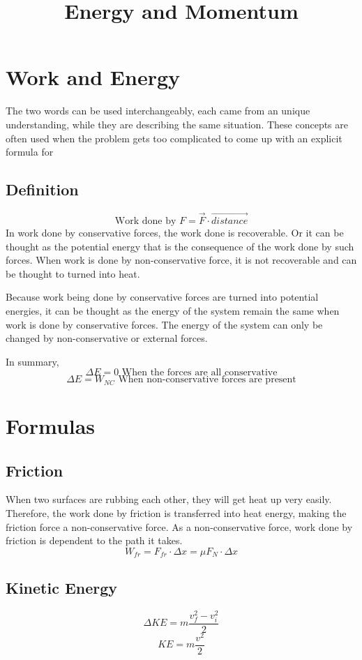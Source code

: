 \documentclass[]{article}
\title{Energy and Momentum}
\author{}
\begin{document}
\maketitle
\section{Work and Energy}
The two words can be used interchangeably, each came from an unique understanding, while they are describing the same situation. These concepts are often used when the problem gets too complicated to come up with an explicit formula for  

\subsection{Definition}
	$$\text{Work done by } F = \vec{F} \cdot \vec{distance}$$
	In work done by conservative forces, the work done is recoverable. Or it can be thought as the potential energy that is the consequence of the work done by such forces.
	When work is done by non-conservative force, it is not recoverable and can be thought to turned into heat. 

	Because work being done by conservative forces are turned into potential energies, it can be thought as the energy of the system remain the same when work is done by conservative forces. The energy of the system can only be changed by non-conservative or external forces.
	
	In summary,
	$$\Delta E = 0 \text{ When the forces are all conservative}$$
	$$\Delta E = W_{NC} \text{ When non-conservative forces are present}$$ 
\section{Formulas}	
	\subsection{Friction}
	When two surfaces are rubbing each other, they will get heat up very easily. Therefore, the work done by friction is transferred into heat energy, making the friction force a non-conservative force. As a non-conservative force, work done by friction is dependent to the path it takes. 
	$$W_{fr} = F_{fr}\cdot \Delta x = \mu F_N \cdot \Delta x$$

	\subsection{Kinetic Energy}
	$$\Delta KE = m \frac{v_f^2 - v^2_i}{2}$$
	$$KE = m\frac{v^2}{2}$$
\end{document}
